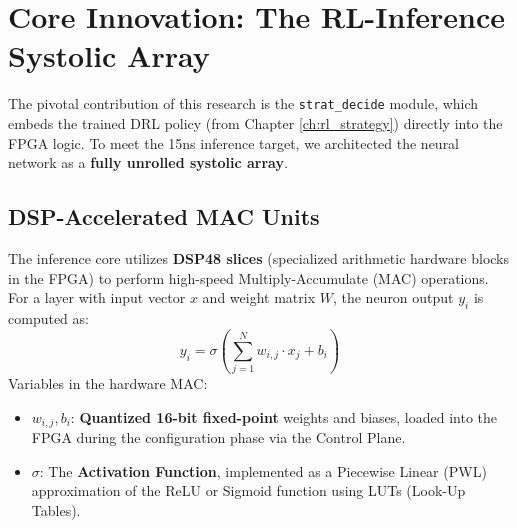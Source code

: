 \section{Core Innovation: The RL-Inference Systolic Array}
The pivotal contribution of this research is the \texttt{strat\_decide} module, which embeds the trained DRL policy (from Chapter \ref{ch:rl_strategy}) directly into the FPGA logic. To meet the 15ns inference target, we architected the neural network as a \textbf{fully unrolled systolic array}.

\subsection{DSP-Accelerated MAC Units}
The inference core utilizes \textbf{DSP48 slices} (specialized arithmetic hardware blocks in the FPGA) to perform high-speed Multiply-Accumulate (MAC) operations. For a layer with input vector $x$ and weight matrix $W$, the neuron output $y_i$ is computed as:
\begin{equation}
    y_i = \sigma \left( \sum_{j=1}^{N} w_{i,j} \cdot x_j + b_i \right)
\end{equation}
Variables in the hardware MAC:
\begin{itemize}
    \item $w_{i,j}, b_i$: \textbf{Quantized 16-bit fixed-point} weights and biases, loaded into the FPGA during the configuration phase via the Control Plane.
    \item $\sigma$: The \textbf{Activation Function}, implemented as a Piecewise Linear (PWL) approximation of the ReLU or Sigmoid function using LUTs (Look-Up Tables).
\end{itemize}

